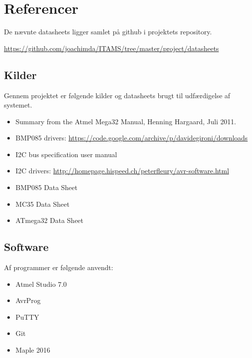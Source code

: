 \section{Referencer}\label{sec:refs}

De nævnte datasheets ligger samlet på github i projektets repository.

\begin{center}
	\url{https://github.com/joachimda/ITAMS/tree/master/project/datasheets}
\end{center}

\subsection{Kilder}

Gennem projektet er følgende kilder og datasheets brugt til udfærdigelse af systemet. 

\begin{itemize}
	\item Summary from the Atmel Mega32 Manual, Henning Hargaard, Juli 2011.
	\item BMP085 drivers: \url{https://code.google.com/archive/p/davidegironi/downloads}
	\item I2C bus specification user manual
	\item I2C drivers: \url{http://homepage.hispeed.ch/peterfleury/avr-software.html}
	\item BMP085 Data Sheet
	\item MC35 Data Sheet
	\item ATmega32 Data Sheet
\end{itemize}

\subsection{Software}

Af programmer er følgende anvendt:

\begin{itemize}
	\item Atmel Studio 7.0
	\item AvrProg
	\item PuTTY
	\item Git
	\item Maple 2016
\end{itemize}
